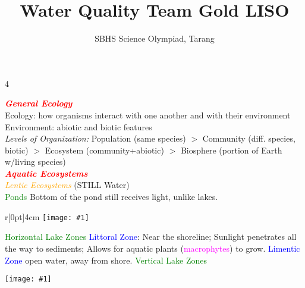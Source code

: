 \documentclass{article}
\title{Water Quality Team Gold LISO}
\author{SBHS Science Olympiad, Tarang}
\newcommand{\red}[1]{\textcolor{red}{#1}}
\newcommand{\green}[1]{\textcolor{green}{#1}}
\newcommand{\blue}[1]{\textcolor{blue}{#1}}
\newcommand{\pink}[1]{\textcolor{magenta}{#1}}
\newcommand{\orange}[1]{\textcolor{orange}{#1}}
\newcommand{\mysection}[1]{\textbf{\textit{\red{#1}}}}
\newcommand{\mysubsection}[1]{{\textit{\orange{#1}}}}
\newcommand{\mysubsub}[1]{{{\green{#1}}}}
\newcommand{\mysubsubsub}[1]{{{\blue{#1}}}}
\newcommand{\vocab}[1]{{\pink{#1}}}
\newcommand{\fig}[1]{
	\texttt{[image: \#1]}
}
\newcommand{\figwrap}[4]{
	\begin{wrapfigure}[#3]{#4}[0pt]{#2cm}
		\texttt{[image: \#1]}
	\end{wrapfigure}
}
\begin{document}
	\begin{multicols*}{4}
		
		\noindent
		\mysection{General Ecology} \\
		Ecology: how organisms interact with one another and with their environment \\
		Environment: abiotic and biotic features\\
		\textit{Levels of Organization:} Population (same species) $>$  Community (diff. species, biotic) $>$ Ecosystem (community+abiotic) $>$ Biosphere (portion of Earth w/living species)
		\\
		\mysection{Aquatic Ecosystems} \\
		\mysubsection{Lentic Ecosystems} (STILL Water) \\
		\mysubsub{Ponds} Bottom of the pond still receives light, unlike lakes.
		\figwrap{lakezones}{4}{8}{r}
		\mysubsub{Horizontal Lake Zones}
		\mysubsubsub{Littoral Zone}: Near the shoreline; Sunlight penetrates all the way to sediments; Allows for aquatic plants (\vocab{macrophytes}) to grow.
		\mysubsubsub{Limentic Zone} open water, away from shore.
		\mysubsub{Vertical Lake Zones} 
		\fig{lakezones}
		
		
	\end{multicols*}
\end{document}
